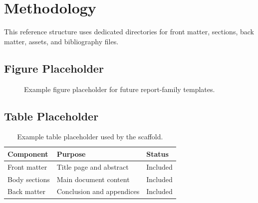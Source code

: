 \chapter{Methodology}

This reference structure uses dedicated directories for front matter, sections, back matter, assets, and bibliography files.

\section{Figure Placeholder}

\begin{figure}[htbp]
  \centering
  \fbox{\rule{0pt}{2in}\rule{0.8\linewidth}{0pt}}
  \caption{Example figure placeholder for future report-family templates.}
\end{figure}

\section{Table Placeholder}

\begin{table}[htbp]
  \centering
  \begin{tabular}{lll}
    \toprule
    Component & Purpose & Status \\
    \midrule
    Front matter & Title page and abstract & Included \\
    Body sections & Main document content & Included \\
    Back matter & Conclusion and appendices & Included \\
    \bottomrule
  \end{tabular}
  \caption{Example table placeholder used by the scaffold.}
\end{table}
